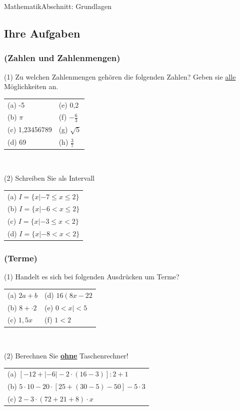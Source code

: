 \documentclass[11pt,twocolumn,oneside,openany,headings=optiontotoc,11pt,numbers=noenddot]{article}
\begin{document}
\begin{worksheet}{}{Mathematik}{Abschnitt: Grundlagen}
		\subsection{Ihre Aufgaben}
		\subsubsection*{(Zahlen und Zahlenmengen)}
		(1) Zu welchen Zahlenmengen gehören die folgenden Zahlen? Geben sie \underline{alle} Möglichkeiten an.\\
		\begin{tabularx}{0.48\textwidth}{XX}
			(a) -5 & (e) 0,2\\
			(b) $\pi$ & (f) $-\frac{6}{3}$\\
			(c) 1,23456789 & (g) $\sqrt{5}$\\
			(d) 69 & (h) $\frac{3}{7}$
		\end{tabularx}\\
		\par\bigskip\noindent
		(2) Schreiben Sie als Intervall\\
		\begin{tabularx}{0.48\textwidth}{X}
			(a) \(I = \{x|-7\leq x\leq 2\}\)\\
			(b) \(I = \{x|-6< x\leq 2\}\)\\
			(c) \(I = \{x|-3\leq x< 2\}\)\\
			(d) \(I = \{x|-8< x< 2\}\)
		\end{tabularx}
		\subsubsection*{(Terme)}
		(1) Handelt es sich bei folgenden Ausdrücken um Terme?\\
		\begin{tabularx}{0.5\textwidth}{XX}
			(a) \(2a+b\) & (d) \(16\left(8x-22\right.\)\\
			(b) \(8 + \cdot{} 2\) & (e) \(0 < x| <5\)\\
			(c) \(1,5x\) & (f) \(1<2\)
		\end{tabularx}\\
		\par\bigskip\noindent
		(2) Berechnen Sie \underline{\textbf{ohne}} Taschenrechner!\\
		\begin{tabularx}{0.5\textwidth}{X}
			(a) \(\left[-12 + |-6| -2\cdot{}(16-3)\right]:2 + 1\)\\
			(b) \(5\cdot{}10 -20\cdot\left[25+(30-5)-50\right]-5\cdot{}3\)\\
			(c) \(2-3\cdot{}(72+21+8)\cdot{}x\)
		\end{tabularx}

\end{worksheet}
\end{document}
